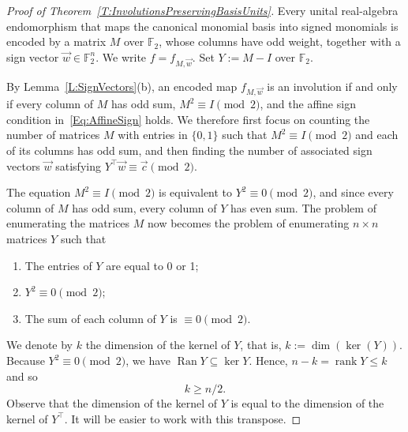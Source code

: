 \documentclass[12pt]{amsart}
\theoremstyle{plain}
\theoremstyle{definition}
\numberwithin{equation}{section}
\begin{document}
\begin{proof}[Proof of Theorem~\ref{T:InvolutionsPreservingBasisUnits}]
Every unital real-algebra endomorphism that maps the canonical monomial basis into signed monomials is encoded by a matrix $M$ over $\mathbb F_2$, whose columns have odd weight, together with a sign vector $\vec w\in\mathbb F_2^n$. We write $f=f_{M,\vec w}$. Set $Y:=M-I$ over $\mathbb F_2$. 

By Lemma~\ref{L:SignVectors}(b), an encoded map $f_{M,\vec w}$ is an involution if and only if every column of $M$ has odd sum, $M^2\equiv I\pmod 2$, and the affine sign condition in~\eqref{Eq:AffineSign} holds. We therefore first focus on counting the number of matrices $M$ with entries in $\{ 0, 1 \}$ such that $M^2 \equiv I \pmod 2$ and each of its columns has odd sum, and then finding the number of associated sign vectors $\vec{w}$ satisfying $Y^\top \vec{w} \equiv \vec{c} \pmod 2$. 

The equation $M^2 \equiv I \pmod 2$ is equivalent to $Y^2 \equiv 0 \pmod 2$, and since every column of $M$ has odd sum, every column of $Y$ has even sum. The problem of enumerating the matrices $M$ now becomes the problem of enumerating $n\times n$ matrices $Y$ such that
\begin{enumerate}[label=\arabic*)]
\item The entries of $Y$ are equal to 0 or 1;
    \item $Y^2\equiv 0\pmod{2}$;
    \item The sum of each column of $Y$ is $\equiv 0 \pmod{2}$.
\end{enumerate}
We denote by $k$ the dimension of the kernel of $Y$, that is, $k:= \dim(\ker (Y))$. Because $Y^2 \equiv 0 \pmod 2$, we have $\operatorname{Ran} Y \subseteq \operatorname{ker} Y$. Hence, $n - k = \operatorname{rank} Y \leq k$ and so
\begin{equation}\label{e1}
    k\ge n/2.
\end{equation}
Observe that the dimension of the kernel of $Y$ is equal to the dimension of the kernel of $Y^\top$. It will be easier to work with this transpose. 


\end{proof}
\end{document}
